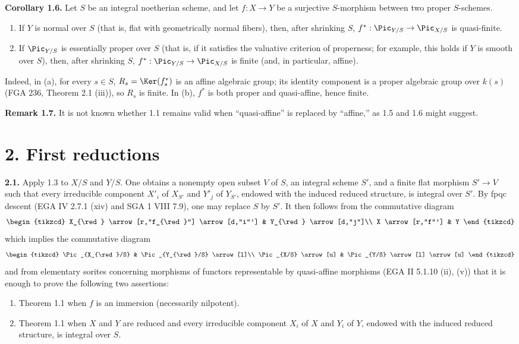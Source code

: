 \textbf{Corollary 1.6.} Let $S$ be an integral noetherian scheme, and let
$f:X\to Y$ be a surjective $S$-morphism between two proper $S$-schemes.
\begin{enumerate}[label=\alph*)]
\item If $Y$ is normal over $S$ (that is, flat with geometrically normal
  fibers), then, after shrinking $S$,
  $f^*:\Pic_{Y/S}\to\Pic_{X/S}$ is quasi-finite.
\item If $\Pic_{Y/S}$ is essentially proper over $S$ (that is, if it
  satisfies the valuative criterion of properness; for example, this holds
  if $Y$ is smooth over $S$), then, after shrinking $S$,
  $f^*:\Pic_{Y/S}\to\Pic_{X/S}$ is finite (and, in particular, affine).
\end{enumerate}
Indeed, in (a), for every $s\in S$, $R_s=\Ker(f_s^*)$ is an affine algebraic
group; its identity component is a proper algebraic group over $k(s)$
(FGA 236, Theorem 2.1 (iii)), so $R_s$ is finite. In (b), $f^*$ is both
proper and quasi-affine, hence finite.

\textbf{Remark 1.7.} It is not known whether 1.1 remains valid when
``quasi-affine'' is replaced by ``affine,'' as 1.5 and 1.6 might suggest.

\section*{2. First reductions}

\textbf{2.1.} Apply 1.3 to $X/S$ and $Y/S$. One obtains a nonempty open
subset $V$ of $S$, an integral scheme $S'$, and a finite flat morphism
$S'\to V$ such that every irreducible component $X'_i$ of $X_{S'}$ and
$Y'_j$ of $Y_{S'}$, endowed with the induced reduced structure, is integral
over $S'$. By fpqc descent (EGA IV 2.7.1 (xiv) and SGA 1 VIII 7.9), one may
replace $S$ by $S'$. It then follows from the commutative diagram
\[
\begin{tikzcd}
X_{\red} \arrow[r,"f_{\red}"] \arrow[d,"i"'] & Y_{\red} \arrow[d,"j"]\\
X \arrow[r,"f"'] & Y
\end{tikzcd}
\]
which implies the commutative diagram
\[
\begin{tikzcd}
\Pic_{X_{\red}/S} & \Pic_{Y_{\red}/S} \arrow[l]\\
\Pic_{X/S} \arrow[u] & \Pic_{Y/S} \arrow[l] \arrow[u]
\end{tikzcd}
\]
and from elementary sorites concerning morphisms of functors representable
by quasi-affine morphisms (EGA II 5.1.10 (ii), (v)) that it is enough to prove
the following two assertions:
\begin{enumerate}[label=\Roman*.]
\item Theorem 1.1 when $f$ is an immersion (necessarily nilpotent).
\item Theorem 1.1 when $X$ and $Y$ are reduced and every irreducible component
  $X_i$ of $X$ and $Y_i$ of $Y$, endowed with the induced reduced structure,
  is integral over $S$.
\end{enumerate}

